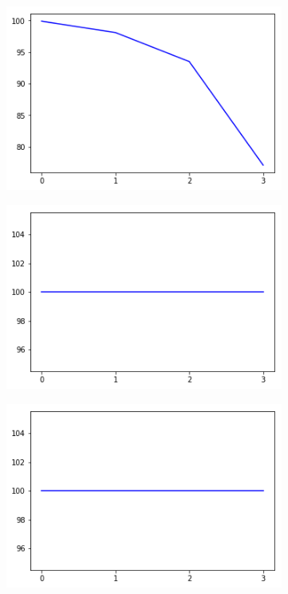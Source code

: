 \begin{figure}[h!]
  \centering
  \begin{subfigure}[b]{0.3\linewidth}
    \includegraphics[width=\linewidth]{images/add/ef0_percent.png}
    \caption{}
  \end{subfigure}
  \begin{subfigure}[b]{0.3\linewidth}
    \includegraphics[width=\linewidth]{images/add/ef1_percent.png}
    \caption{}
  \end{subfigure}
  \begin{subfigure}[b]{0.3\linewidth}
    \includegraphics[width=\linewidth]{images/add/ef2_percent.png}
    \caption{}
  \end{subfigure}
  

\end{figure}
